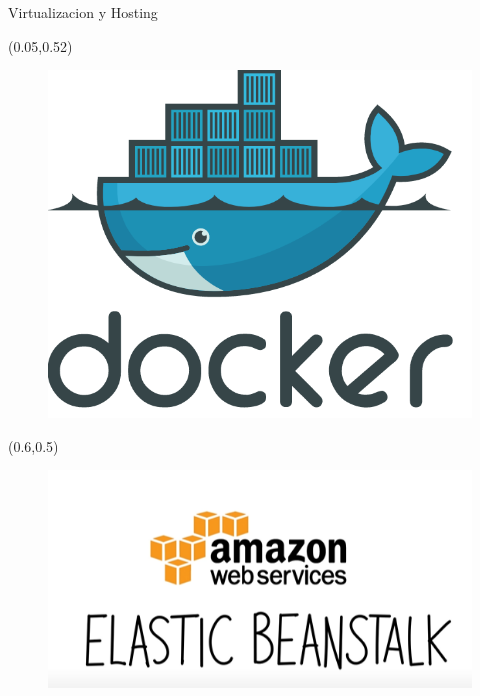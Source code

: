 \documentclass[xcolor=pdftex,dvipsnames,table]{beamer}
\begin{document}
\begin{frame}{Virtualizacion y Hosting}
    \begin{textblock*}{0.48\textwidth}(0.05\textwidth,0.52\textwidth)  
                    \begin{figure}
                        \centering
                        \includegraphics[width=0.4\linewidth]{implementacion/dockerlogo.png}
                        \label{fig:my_label}
                    \end{figure}
    \end{textblock*}
    
    \begin{textblock*}{0.4\textwidth}(0.6\textwidth,0.5\textwidth)  
                    \begin{figure}
                        \centering
                        \includegraphics[width=0.9\linewidth]{implementacion/eblogo.png}
                        \label{fig:my_label}
                    \end{figure}
    \end{textblock*}
\end{frame}
\end{document}
